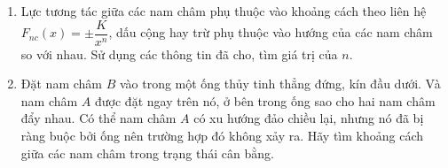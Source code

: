 \begin{vd}
\begin{center}

\end{center}
\begin{enumerate}[1)]
    \item Lực tương tác giữa các nam châm phụ thuộc vào khoảng cách theo liên hệ $F_{nc}(x)=\pm\dfrac{K}{x^n}$, dấu cộng hay trừ phụ thuộc vào hướng của các nam châm so với nhau. Sử dụng các thông tin đã cho, tìm giá trị của $n$.
    \item Đặt nam châm $B$ vào trong một ống thủy tinh thẳng đứng, kín đầu dưới. Và nam châm $A$ được đặt ngay trên nó, ở bên trong ống sao cho hai nam châm đẩy nhau. Có thể nam châm $A$ có xu hướng đảo chiều lại, nhưng nó đã bị ràng buộc bởi ống nên trường hợp đó không xảy ra. Hãy tìm khoảng cách giữa các nam châm trong trạng thái cân bằng.
\end{enumerate}

\end{vd}

